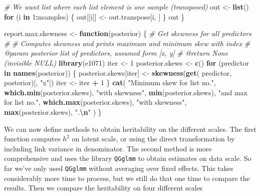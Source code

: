 \documentclass[
]{article}
\newenvironment{Shaded}{\begin{snugshade}}{\end{snugshade}}
\newcommand{\CommentTok}[1]{\textcolor[rgb]{0.56,0.35,0.01}{\textit{#1}}}
\newcommand{\ControlFlowTok}[1]{\textcolor[rgb]{0.13,0.29,0.53}{\textbf{#1}}}
\newcommand{\DecValTok}[1]{\textcolor[rgb]{0.00,0.00,0.81}{#1}}
\newcommand{\FunctionTok}[1]{\textcolor[rgb]{0.13,0.29,0.53}{\textbf{#1}}}
\newcommand{\NormalTok}[1]{#1}
\newcommand{\OtherTok}[1]{\textcolor[rgb]{0.56,0.35,0.01}{#1}}
\newcommand{\SpecialCharTok}[1]{\textcolor[rgb]{0.81,0.36,0.00}{\textbf{#1}}}
\newcommand{\StringTok}[1]{\textcolor[rgb]{0.31,0.60,0.02}{#1}}
\begin{document}
\begin{Shaded}
\begin{Highlighting}[]
  \CommentTok{\# We want list where each list element is one sample (transposed)}
\NormalTok{  out }\OtherTok{\textless{}{-}} \FunctionTok{list}\NormalTok{()}
  \ControlFlowTok{for}\NormalTok{ (i }\ControlFlowTok{in} \DecValTok{1}\SpecialCharTok{:}\NormalTok{nsamples) \{}
\NormalTok{    out[[i]] }\OtherTok{\textless{}{-}}\NormalTok{ out.transpose[i, ]}
\NormalTok{  \}}
\NormalTok{  out}
\NormalTok{\}}


\NormalTok{report.max.skewness }\OtherTok{\textless{}{-}} \ControlFlowTok{function}\NormalTok{(posterior) \{}
  \CommentTok{\#\textquotesingle{} Get skewness for all predictors}
  \CommentTok{\#\textquotesingle{}}
  \CommentTok{\#\textquotesingle{} Computes skewness and prints maximum and minimum skew with index}
  \CommentTok{\#\textquotesingle{} @param posterior list of predictors, assumed form [x, y]}
  \CommentTok{\#\textquotesingle{} @return None (invisible \textasciigrave{}NULL\textasciigrave{})}
  \FunctionTok{library}\NormalTok{(e1071)}
\NormalTok{  iter }\OtherTok{\textless{}{-}} \DecValTok{1}
\NormalTok{  posterior.skews }\OtherTok{\textless{}{-}} \FunctionTok{c}\NormalTok{()}
  \ControlFlowTok{for}\NormalTok{ (predictor }\ControlFlowTok{in} \FunctionTok{names}\NormalTok{(posterior)) \{}
\NormalTok{    posterior.skews[iter] }\OtherTok{\textless{}{-}} \FunctionTok{skewness}\NormalTok{(}\FunctionTok{get}\NormalTok{(}
\NormalTok{      predictor, posterior)[, }\StringTok{"x"}\NormalTok{])}
\NormalTok{    iter }\OtherTok{\textless{}{-}}\NormalTok{ iter }\SpecialCharTok{+} \DecValTok{1}
\NormalTok{  \}}
  \FunctionTok{cat}\NormalTok{(}
    \StringTok{"Minimum skew for list no."}\NormalTok{, }\FunctionTok{which.min}\NormalTok{(posterior.skews), }
  \StringTok{"with skewness"}\NormalTok{,}
    \FunctionTok{min}\NormalTok{(posterior.skews), }\StringTok{"and max for list no."}\NormalTok{,}
  \FunctionTok{which.max}\NormalTok{(posterior.skews),}
    \StringTok{"with skewness"}\NormalTok{, }\FunctionTok{max}\NormalTok{(posterior.skews), }\StringTok{".}\SpecialCharTok{\textbackslash{}n}\StringTok{"}
\NormalTok{  )}
\NormalTok{\}}
\end{Highlighting}
\end{Shaded}

We can now define methods to obtain heritability on the different
scales. The first function computes \(h^2\) on latent scale, or using
the direct transformation by including link variance in denominator. The
second method is more comprehensive and uses the library \texttt{QGglmm}
to obtain estimates on data scale. So far we've only used
\texttt{QGglmm} without averaging over fixed effects. This takes
considerably more time to process, but we still do that one time to
compare the results. Then we compare the heritability on four different
scales
\end{document}
